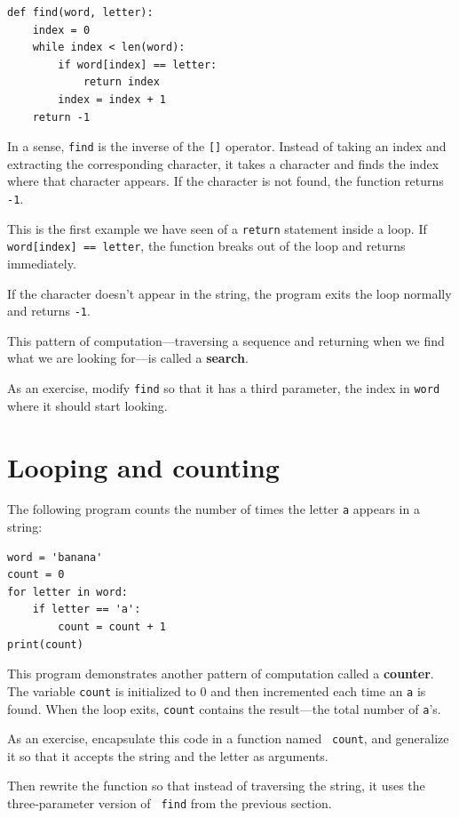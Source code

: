 \documentclass[10pt]{book}
\begin{document}
\begin{verbatim}
def find(word, letter):
    index = 0
    while index < len(word):
        if word[index] == letter:
            return index
        index = index + 1
    return -1
\end{verbatim}
%
In a sense, {\tt find} is the inverse of the {\tt []} operator.
Instead of taking an index and extracting the corresponding character,
it takes a character and finds the index where that character
appears.  If the character is not found, the function returns {\tt
-1}.

This is the first example we have seen of a {\tt return} statement
inside a loop.  If {\tt word[index] == letter}, the function breaks
out of the loop and returns immediately.

If the character doesn't appear in the string, the program
exits the loop normally and  returns {\tt -1}.

This pattern of computation---traversing a sequence and returning
when we find what we are looking for---is called a {\bf search}.

As an exercise, modify {\tt find} so that it has a
third parameter, the index in {\tt word} where it should start
looking.


\section{Looping and counting}
\label{counter}

The following program counts the number of times the letter {\tt a}
appears in a string:

\begin{verbatim}
word = 'banana'
count = 0
for letter in word:
    if letter == 'a':
        count = count + 1
print(count)
\end{verbatim}
%
This program demonstrates another pattern of computation called a {\bf
counter}.  The variable {\tt count} is initialized to 0 and then
incremented each time an {\tt a} is found.
When the loop exits, {\tt count}
contains the result---the total number of {\tt a}'s.

As an exercise, encapsulate this code in a function named {\tt
count}, and generalize it so that it accepts the string and the
letter as arguments.

Then rewrite the function so that instead of
traversing the string, it uses the three-parameter version of {\tt
find} from the previous section.
\end{document}

